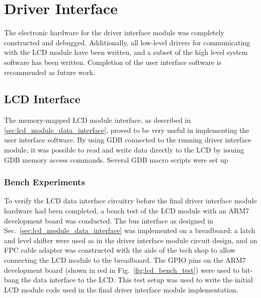 \section{Driver Interface}

The electronic hardware for the driver interface module was completely constructed and debugged. Additionally, all low-level drivers for communicating with the LCD module have been written, and a subset of the high level system software has been written. Completion of the user interface software is recommended as future work.




\subsection{LCD Interface}

The memory-mapped LCD module interface, as described in \ref{sec:lcd_module_data_interface}, proved to be very useful in implementing the user interface software. By using GDB connected to the running driver interface module, it was possible to read and write data directly to the LCD by issuing GDB memory access commands. Several GDB macro scripts were set up

\subsubsection{Bench Experiments}

To verify the LCD data interface circuitry before the final driver interface module hardware had been completed, a bench test of the LCD module with an ARM7 development board was conducted. The bus interface as designed in Sec.\ \ref{sec:lcd_module_data_interface} was implemented on a breadboard: a latch and level shifter were used as in the driver interface module circuit design, and an FPC cable adapter was constructed with the aide of the tech shop to allow connecting the LCD module to the breadboard. The GPIO pins on the ARM7 development board (shown in red in Fig.\ \ref{fig:lcd_bench_test}) were used to bit-bang the data interface to the LCD. This test setup was used to write the initial LCD module code used in the final driver interface module implementation.

